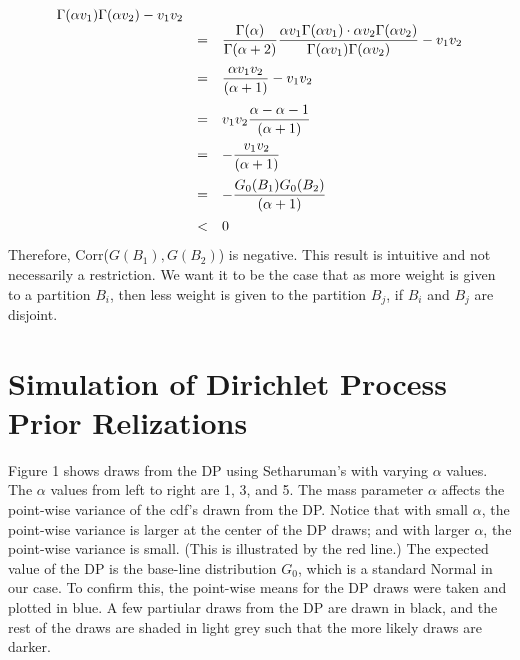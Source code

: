 \documentclass{article}
\def\ds{\displaystyle}
\begin{document}
\[\begin{array}{rcl}
                            {\Gamma(\alpha v_1)\Gamma(\alpha v_2)} - v_1 v_2\\
                            \vspace{.7em}
                        &=& \ds\frac{\Gamma(\alpha)}{\Gamma(\alpha+2)}
                            \ds\frac{\alpha v_1\Gamma(\alpha v_1) \cdot \alpha v_2\Gamma(\alpha v_2)}
                            {\Gamma(\alpha v_1)\Gamma(\alpha v_2)} - v_1 v_2\\
                            \vspace{.7em}
                        &=& \ds\frac{\alpha v_1 v_2}{(\alpha +1)} - v_1 v_2 \\
                            \vspace{.5em}
                        &=& v_1 v_2 \ds\frac{\alpha - \alpha - 1}{(\alpha +1)} \\
                            \vspace{.5em}
                        &=& -\ds\frac{v_1 v_2 }{(\alpha +1)} \\
                            \vspace{.5em}
                        &=& -\ds\frac{G_0(B_1) G_0(B_2) }{(\alpha +1)} \\
                        &<& 0 \\
  \end{array}
\]
Therefore, Corr($G(B_1),G(B_2)$) is negative. This result is intuitive and not necessarily a restriction.
We want it to be the case that as more weight is given to a partition $B_i$, then less weight is
given to the partition $B_j$, if $B_i$ and $B_j$ are disjoint.

\newpage
\section{Simulation of Dirichlet Process Prior Relizations}
Figure 1 shows draws from the DP using Setharuman's with varying $\alpha$
values. The $\alpha$ values from left to right are 1, 3, and 5. The mass
parameter $\alpha$ affects the point-wise variance of the cdf's drawn from the
DP. Notice that with small $\alpha$, the point-wise variance is larger at the
center of the DP draws; and with larger $\alpha$, the point-wise variance is
small. (This is illustrated by the red line.) The expected value of the DP is
the base-line distribution $G_0$, which is a standard Normal in our case.  To
confirm this, the point-wise means for the DP draws were taken and plotted in
blue. A few partiular draws from the DP are drawn in black, and the rest of the
draws are shaded in light grey such that the more likely draws are darker. \\
\end{document}
